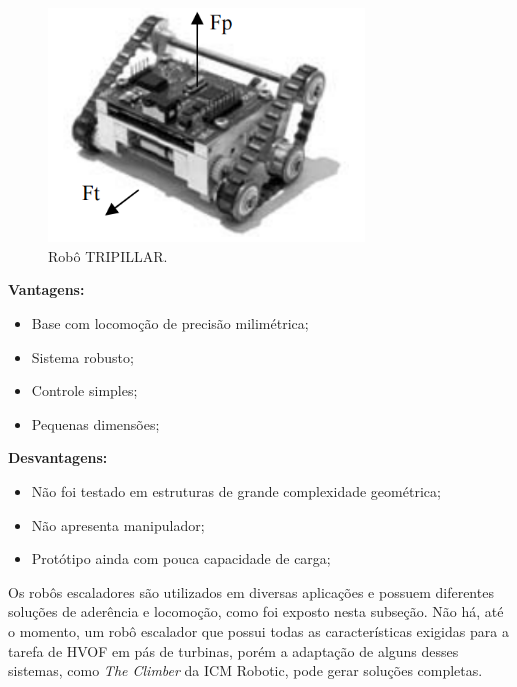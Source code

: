 \begin{figure}[ht]
\centering
\includegraphics[width=8.4cm]{figs/climbers/tripillar.png}
\caption{Robô TRIPILLAR.}
\label{tripillar}
\end{figure}

\textbf{Vantagens:}
\begin{itemize}
  \item Base com locomoção de precisão milimétrica;
  \item Sistema robusto;
  \item Controle simples;
  \item Pequenas dimensões; 
\end{itemize}

\textbf{Desvantagens:}
\begin{itemize}
  \item Não foi testado em estruturas de grande complexidade geométrica; 
  \item Não apresenta manipulador;
  \item Protótipo ainda com pouca capacidade de carga;
\end{itemize}
   
Os robôs escaladores são utilizados em diversas aplicações e possuem diferentes
soluções de aderência e locomoção, como foi exposto nesta subseção. Não há,
até o momento, um robô escalador que possui todas as características
exigidas para a tarefa de HVOF em pás de turbinas, porém a adaptação de
alguns desses sistemas, como \emph{The Climber} da ICM Robotic, pode gerar
soluções completas.
